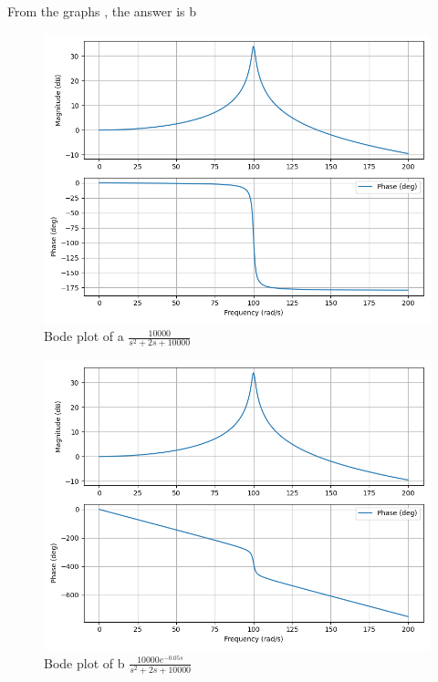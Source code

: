 \documentclass[journal,12pt,onecolumn]{IEEEtran}
\theoremstyle{remark}
\begin{document}
From the graphs , the answer is b
\begin{figure}[h]
    \centering
    \includegraphics[width=\linewidth]{figs/A.png}
    \caption{Bode plot of a $\frac{10000}{s^2+2s+10000}$}
\end{figure}
\begin{figure}[h]
    \centering
    \includegraphics[width=\linewidth]{figs/B.png}
    \caption{Bode plot of b $\frac{10000e^{-0.05s}}{s^2+2s+10000}$}
\end{figure}
\end{document}
